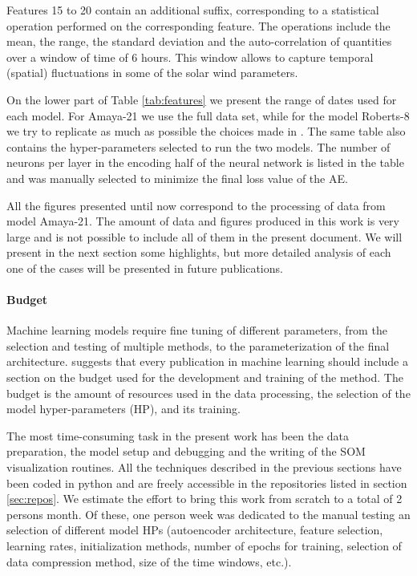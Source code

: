 \documentclass[utf8]{frontiersSCNS} %
\begin{document}
Features 15 to 20 contain an additional suffix, corresponding to a statistical operation performed on the corresponding feature. The operations include the mean, the range, the standard deviation and the auto-correlation of quantities over a window of time of 6 hours. This window allows to capture temporal (spatial) fluctuations in some of the solar wind parameters.

On the lower part of Table \ref{tab:features} we present the range of dates used for each model. For Amaya-21 we use the full data set, while for the model Roberts-8 we try to replicate as much as possible the choices made in \citep{Roberts2020}. The same table also contains the hyper-parameters selected to run the two models. The number of neurons per layer in the encoding half of the neural network is listed in the table and was manually selected to minimize the final loss value of the AE.

All the figures presented until now correspond to the processing of data from model Amaya-21. The amount of data and figures produced in this work is very large and is not possible to include all of them in the present document. We will present in the next section some highlights, but more detailed analysis of each one of the cases will be presented in future publications.

\paragraph{Budget}
Machine learning models require fine tuning of different parameters, from the selection and testing of multiple methods, to the parameterization of the final architecture. \citep{Dodge2019} suggests that every publication in machine learning should include a section on the budget used for the development and training of the method. The budget is the amount of resources used in the data processing, the selection of the model hyper-parameters (HP), and its training.

The most time-consuming task in the present work has been the data preparation, the model setup and debugging and the writing of the SOM visualization routines. All the techniques described in the previous sections have been coded in python and are freely accessible in the repositories listed in section \ref{sec:repos}. We estimate the effort to bring this work from scratch to a total of 2 persons month. Of these, one person week was dedicated to the manual testing an selection of different model HPs (autoencoder architecture, feature selection, learning rates, initialization methods, number of epochs for training, selection of data compression method, size of the time windows, etc.).
\end{document}
